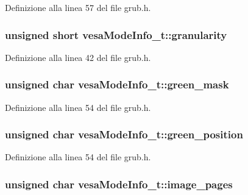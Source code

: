 Definizione alla linea 57 del file grub.\+h.

\hypertarget{structvesaModeInfo__t_a59708e15ac9929ad9218b4ef25f4e861}{
\subsubsection[{granularity}]{\setlength{\rightskip}{0pt plus 5cm}unsigned short vesa\+Mode\+Info\+\_\+t\+::granularity}}\label{structvesaModeInfo__t_a59708e15ac9929ad9218b4ef25f4e861}


Definizione alla linea 42 del file grub.\+h.

\hypertarget{structvesaModeInfo__t_a00414463a3873e70cc7418f109b35f06}{
\subsubsection[{green\+\_\+mask}]{\setlength{\rightskip}{0pt plus 5cm}unsigned char vesa\+Mode\+Info\+\_\+t\+::green\+\_\+mask}}\label{structvesaModeInfo__t_a00414463a3873e70cc7418f109b35f06}


Definizione alla linea 54 del file grub.\+h.

\hypertarget{structvesaModeInfo__t_ac5e0330302132e9423fa856f26a34286}{
\subsubsection[{green\+\_\+position}]{\setlength{\rightskip}{0pt plus 5cm}unsigned char vesa\+Mode\+Info\+\_\+t\+::green\+\_\+position}}\label{structvesaModeInfo__t_ac5e0330302132e9423fa856f26a34286}


Definizione alla linea 54 del file grub.\+h.

\hypertarget{structvesaModeInfo__t_a072aebfd294ef7c940917ad1f5d53176}{
\subsubsection[{image\+\_\+pages}]{\setlength{\rightskip}{0pt plus 5cm}unsigned char vesa\+Mode\+Info\+\_\+t\+::image\+\_\+pages}}\label{structvesaModeInfo__t_a072aebfd294ef7c940917ad1f5d53176}


